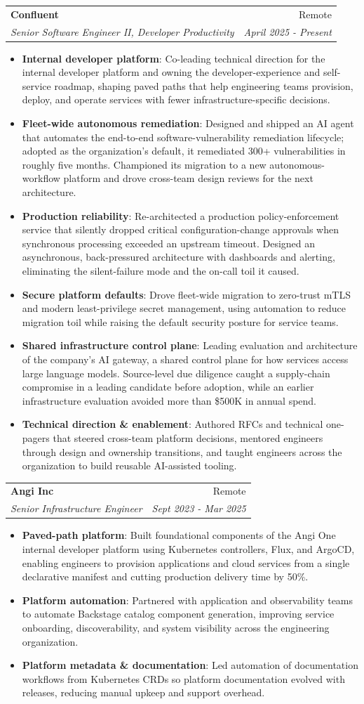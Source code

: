 \documentclass[letterpaper,11pt]{article}
\makeatletter
\newcommand{\resumeItem}[2]{
\item\small{\textbf{#1}{: #2 \vspace{-2pt}}}
}
\newcommand{\resumeSubheading}[4]{
\vspace{-1pt}\item
\begin{tabular*}{0.97\textwidth}[t]{l@{\extracolsep{\fill}}r}
    \textbf{#1} & #2 \\
    \textit{\small#3} & \textit{\small #4} \\
\end{tabular*}\vspace{-3pt}
}
\newcommand{\resumeItemListStart}{\begin{itemize}}
\newcommand{\resumeItemListEnd}{\end{itemize}\vspace{-5pt}}
\makeatother
\begin{document}
\resumeSubheading
{Confluent}{Remote}
{Senior Software Engineer II, Developer Productivity}{April 2025 - Present}
\resumeItemListStart
\resumeItem{Internal developer platform}
{Co-leading technical direction for the internal developer platform and owning the developer-experience and self-service roadmap, shaping paved paths that help engineering teams provision, deploy, and operate services with fewer infrastructure-specific decisions.}
\resumeItem{Fleet-wide autonomous remediation}
{Designed and shipped an AI agent that automates the end-to-end software-vulnerability remediation lifecycle; adopted as the organization's default, it remediated 300+ vulnerabilities in roughly five months. Championed its migration to a new autonomous-workflow platform and drove cross-team design reviews for the next architecture.}
\resumeItem{Production reliability}
{Re-architected a production policy-enforcement service that silently dropped critical configuration-change approvals when synchronous processing exceeded an upstream timeout. Designed an asynchronous, back-pressured architecture with dashboards and alerting, eliminating the silent-failure mode and the on-call toil it caused.}
\resumeItem{Secure platform defaults}
{Drove fleet-wide migration to zero-trust mTLS and modern least-privilege secret management, using automation to reduce migration toil while raising the default security posture for service teams.}
\resumeItem{Shared infrastructure control plane}
{Leading evaluation and architecture of the company's AI gateway, a shared control plane for how services access large language models. Source-level due diligence caught a supply-chain compromise in a leading candidate before adoption, while an earlier infrastructure evaluation avoided more than \$500K in annual spend.}
\resumeItem{Technical direction \& enablement}
{Authored RFCs and technical one-pagers that steered cross-team platform decisions, mentored engineers through design and ownership transitions, and taught engineers across the organization to build reusable AI-assisted tooling.}
\resumeItemListEnd

\resumeSubheading
{Angi Inc}{Remote}
{Senior Infrastructure Engineer}{Sept 2023 - Mar 2025}
\resumeItemListStart
\resumeItem{Paved-path platform}
{Built foundational components of the Angi One internal developer platform using Kubernetes controllers, Flux, and ArgoCD, enabling engineers to provision applications and cloud services from a single declarative manifest and cutting production delivery time by 50\%.}
\resumeItem{Platform automation}
{Partnered with application and observability teams to automate Backstage catalog component generation, improving service onboarding, discoverability, and system visibility across the engineering organization.}
\resumeItem{Platform metadata \& documentation}
{Led automation of documentation workflows from Kubernetes CRDs so platform documentation evolved with releases, reducing manual upkeep and support overhead.}
\resumeItemListEnd
\end{document}
